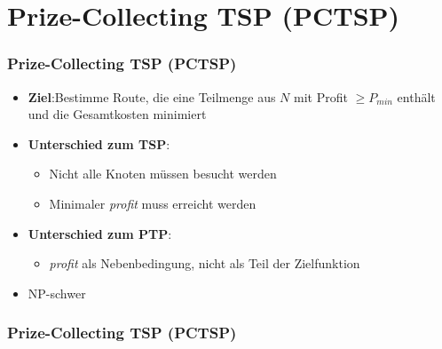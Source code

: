 \documentclass{beamer}
\begin{document}
\section{Prize-Collecting \textsc{TSP} (\textsc{PCTSP})}

\begin{frame}
\frametitle{Prize-Collecting \textsc{TSP} (\textsc{PCTSP})}
\begin{itemize}
  \item \textbf{Ziel}:\newline Bestimme Route, die eine Teilmenge aus $N$ mit Profit $\geq P_{min}$ enthält
  und die Gesamtkosten minimiert
  \item \textbf{Unterschied zum \textsc{TSP}}:
  \begin{itemize}
    \item Nicht alle Knoten müssen besucht werden
    \item Minimaler \textit{profit} muss erreicht werden
  \end{itemize}
  \item \textbf{Unterschied zum \textsc{PTP}}:
  \begin{itemize}
    \item \textit{profit} als Nebenbedingung, nicht als Teil der Zielfunktion
  \end{itemize}
  \item NP-schwer
\end{itemize}
\end{frame}

\begin{frame}
  \frametitle{Prize-Collecting \textsc{TSP} (\textsc{PCTSP})}
\end{frame}
\end{document}
